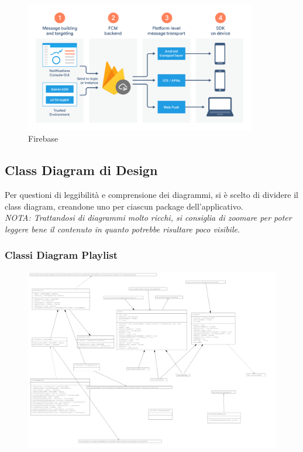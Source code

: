 \documentclass{article}
\begin{document}
		\begin{figure}[H]
			\centering
			\includegraphics[width=0.9\textwidth]{Immagini/firebase}
			\caption{Firebase}
		\end{figure}
		\newpage
		\subsection{Class Diagram di Design}
		Per questioni di leggibilità e comprensione dei diagrammi, si è scelto di dividere il class diagram, creandone uno per ciascun package dell’applicativo.\\
		\textit{NOTA: Trattandosi di diagrammi molto ricchi, si consiglia di zoomare per poter leggere bene il contenuto in quanto potrebbe risultare poco visibile}.
		\newpage
		\subsubsection{Classi Diagram Playlist}
		\begin{figure}[H]
			\centering
			\includegraphics[width=1.0\textwidth]{Immagini/classdiagramdesignplaylist}
		\end{figure}
\end{document}
